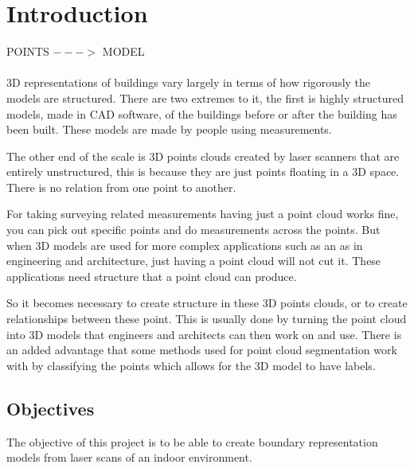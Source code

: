 
\chapter{Introduction}


POINTS $--->$ MODEL\\
\\

3D representations of buildings vary largely in terms of how rigorously the models are structured. There are two extremes to it, the first is highly structured models, made in CAD software, of the buildings before or after the building has been built. These models are made by people using measurements.

The other end of the scale is 3D points clouds created by laser scanners that are entirely unstructured, this is because they are just points floating in a 3D space. There is no relation from one point to another.

For taking surveying related measurements having just a point cloud works fine, you can pick out specific points and do measurements across the points. But when 3D models are used for more complex applications such as an as in engineering and architecture, just having a point cloud will not cut it. These applications need structure that a point cloud can produce.

So it becomes necessary to create structure in these 3D points clouds, or to create relationships between these point. This is usually done by turning the point cloud into 3D models that engineers and architects can then work on and use. There is an added advantage that some methods used for point cloud segmentation work with by classifying the points which allows for the 3D model to have labels.



\section{Objectives}

The objective of this project is to be able to create boundary representation models from laser scans of an indoor environment.

